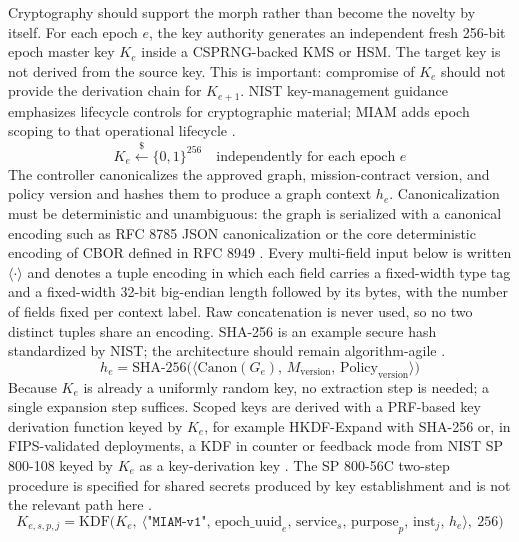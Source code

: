\documentclass[11pt,letterpaper]{article}
\begin{document}
Cryptography should support the morph rather than become the novelty by itself. For each epoch $e$, the key authority generates an independent fresh 256-bit epoch master key $K_e$ inside a CSPRNG-backed KMS or HSM. The target key is not derived from the source key. This is important: compromise of $K_e$ should not provide the derivation chain for $K_{e+1}$. NIST key-management guidance emphasizes lifecycle controls for cryptographic material; MIAM adds epoch scoping to that operational lifecycle \cite{nist80057,nist800133}.
\begin{equation}
K_e\xleftarrow{\$}\{0,1\}^{256}\quad\text{independently for each epoch } e
\end{equation}
The controller canonicalizes the approved graph, mission-contract version, and policy version and hashes them to produce a graph context $h_e$. Canonicalization must be deterministic and unambiguous: the graph is serialized with a canonical encoding such as RFC 8785 JSON canonicalization \cite{rfc8785} or the core deterministic encoding of CBOR defined in RFC 8949 \cite{rfc8949}. Every multi-field input below is written $\langle\cdot\rangle$ and denotes a tuple encoding in which each field carries a fixed-width type tag and a fixed-width 32-bit big-endian length followed by its bytes, with the number of fields fixed per context label. Raw concatenation is never used, so no two distinct tuples share an encoding. SHA-256 is an example secure hash standardized by NIST; the architecture should remain algorithm-agile \cite{fips1804}.
\begin{equation}
h_e=\mathrm{SHA\text{-}256}\big(\langle\mathrm{Canon}(G_e),\,M_{\mathrm{version}},\,\mathrm{Policy}_{\mathrm{version}}\rangle\big)
\end{equation}
Because $K_e$ is already a uniformly random key, no extraction step is needed; a single expansion step suffices. Scoped keys are derived with a PRF-based key derivation function keyed by $K_e$, for example HKDF-Expand with SHA-256 \cite{rfc5869} or, in FIPS-validated deployments, a KDF in counter or feedback mode from NIST SP 800-108 keyed by $K_e$ as a key-derivation key \cite{nist800108,nist800133}. The SP 800-56C two-step procedure is specified for shared secrets produced by key establishment and is not the relevant path here \cite{nist80056c}.
\begin{equation}\label{eq:kdf}
K_{e,s,p,j}=\mathrm{KDF}\big(K_e,\ \langle\texttt{"MIAM-v1"},\,\mathrm{epoch\_uuid}_e,\,\mathrm{service}_s,\,\mathrm{purpose}_p,\,\mathrm{inst}_j,\,h_e\rangle,\ 256\big)
\end{equation}
\end{document}
